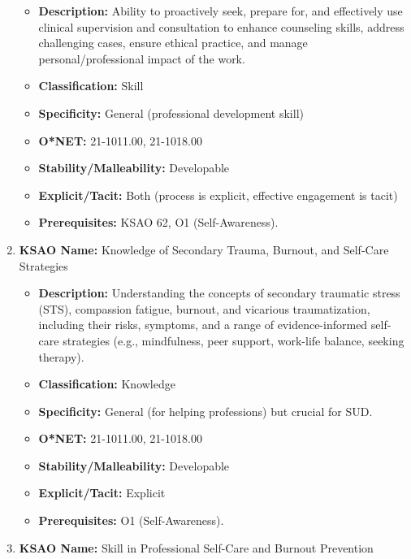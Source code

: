 \documentclass[
  letterpaper,
  DIV=11,
  numbers=noendperiod]{scrartcl}
\providecommand{\tightlist}{%
  \setlength{\itemsep}{0pt}\setlength{\parskip}{0pt}}
\begin{document}
\begin{enumerate}
  \begin{itemize}
  \tightlist
  \item
    \textbf{Description:} Ability to proactively seek, prepare for, and
    effectively use clinical supervision and consultation to enhance
    counseling skills, address challenging cases, ensure ethical
    practice, and manage personal/professional impact of the work.
  \item
    \textbf{Classification:} Skill
  \item
    \textbf{Specificity:} General (professional development skill)
  \item
    \textbf{O*NET:} 21-1011.00, 21-1018.00
  \item
    \textbf{Stability/Malleability:} Developable
  \item
    \textbf{Explicit/Tacit:} Both (process is explicit, effective
    engagement is tacit)
  \item
    \textbf{Prerequisites:} KSAO 62, O1 (Self-Awareness).
  \end{itemize}
\item
  \textbf{KSAO Name:} Knowledge of Secondary Trauma, Burnout, and
  Self-Care Strategies

  \begin{itemize}
  \tightlist
  \item
    \textbf{Description:} Understanding the concepts of secondary
    traumatic stress (STS), compassion fatigue, burnout, and vicarious
    traumatization, including their risks, symptoms, and a range of
    evidence-informed self-care strategies (e.g., mindfulness, peer
    support, work-life balance, seeking therapy).
  \item
    \textbf{Classification:} Knowledge
  \item
    \textbf{Specificity:} General (for helping professions) but crucial
    for SUD.
  \item
    \textbf{O*NET:} 21-1011.00, 21-1018.00
  \item
    \textbf{Stability/Malleability:} Developable
  \item
    \textbf{Explicit/Tacit:} Explicit
  \item
    \textbf{Prerequisites:} O1 (Self-Awareness).
  \end{itemize}
\item
  \textbf{KSAO Name:} Skill in Professional Self-Care and Burnout
  Prevention


\end{enumerate}
\end{document}
